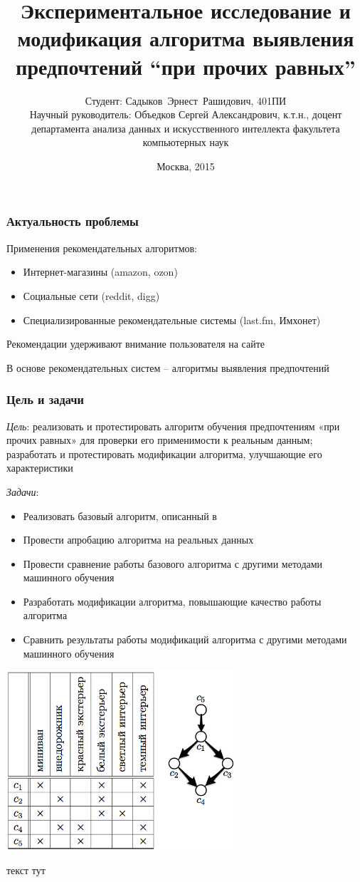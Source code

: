 \documentclass{beamer}
\title[Выявление предпочтений \enquote{при прочих равных}] %
{Экспериментальное исследование и модификация алгоритма выявления предпочтений \enquote{при прочих равных}}
\author[Садыков~Э.Р.]{Студент: Садыков~Эрнест~Рашидович, 401ПИ \\ 
	\vspace{1em}
	Научный руководитель: Объедков Сергей Александрович, к.т.н., доцент департамента анализа данных и искусственного интеллекта факультета компьютерных наук
}
\institute
{
	Национальный исследовательский университет\\
	Высшая школа экономики
}
\date{Москва, 2015}
\theoremstyle{definition}
\begin{document}
	\frame{\titlepage}
	\begin{frame}
		\frametitle{Актуальность проблемы}
		Применения рекомендательных алгоритмов:
		\begin{itemize}
			\item Интернет-магазины (amazon, ozon)
			\item Социальные сети (reddit, digg)
			\item Специализированные рекомендательные системы (last.fm, Имхонет)
		\end{itemize}
		
		\pause
		
		\vspace{1.5em}
		Рекомендации удерживают внимание пользователя на сайте

		\pause 
		
		\vspace{1.5em}
		В основе рекомендательных систем – алгоритмы выявления предпочтений
	\end{frame}
	
	\begin{frame}
		\frametitle{Цель и задачи}
		\emph{Цель}: реализовать и протестировать алгоритм обучения предпочтениям «при прочих равных» для проверки его применимости к реальным данным; разработать и протестировать модификации алгоритма, улучшающие его характеристики

		\pause
		\vspace{1em}
		
		\emph{Задачи}:
		\begin{itemize}
			\item Реализовать базовый алгоритм, описанный в \cite{Obiedkov:2013}
			\item Провести апробацию алгоритма на реальных данных 
			\item Провести сравнение работы базового алгоритма с другими методами машинного обучения
			\item Разработать модификации алгоритма, повышающие качество работы алгоритма
			\item Сравнить результаты работы модификаций алгоритма с другими методами машинного обучения
		\end{itemize}
	\end{frame}
	
	\begin{frame}
		\begin{center}
		\includegraphics[width=85mm]{./images/context.png}
		\end{center}
		текст тут
	\end{frame}
\end{document}
